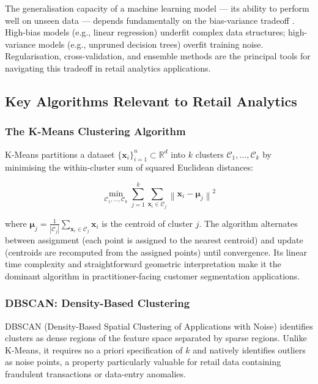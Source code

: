 The generalisation capacity of a machine learning model — its ability to perform well on unseen data — depends fundamentally on the bias-variance tradeoff \cite{Goodfellow2016}. High-bias models (e.g., linear regression) underfit complex data structures; high-variance models (e.g., unpruned decision trees) overfit training noise. Regularisation, cross-validation, and ensemble methods are the principal tools for navigating this tradeoff in retail analytics applications.

\subsection{Key Algorithms Relevant to Retail Analytics}

\subsubsection{The K-Means Clustering Algorithm}

K-Means \cite{jain1999data} partitions a dataset $\{\mathbf{x}_i\}_{i=1}^n \subset \mathbb{R}^d$ into $k$ clusters $\mathcal{C}_1, \ldots, \mathcal{C}_k$ by minimising the within-cluster sum of squared Euclidean distances:

\begin{equation}
    \min_{\mathcal{C}_1,\ldots,\mathcal{C}_k} \sum_{j=1}^k \sum_{\mathbf{x}_i \in \mathcal{C}_j} \left\|\mathbf{x}_i - \boldsymbol{\mu}_j\right\|^2
    \label{eq:kmeans_objective}
\end{equation}

where $\boldsymbol{\mu}_j = \frac{1}{|\mathcal{C}_j|} \sum_{\mathbf{x}_i \in \mathcal{C}_j} \mathbf{x}_i$ is the centroid of cluster $j$. The algorithm alternates between assignment (each point is assigned to the nearest centroid) and update (centroids are recomputed from the assigned points) until convergence. Its linear time complexity and straightforward geometric interpretation make it the dominant algorithm in practitioner-facing customer segmentation applications.

\subsubsection{DBSCAN: Density-Based Clustering}

DBSCAN (Density-Based Spatial Clustering of Applications with Noise) \cite{ester1996density} identifies clusters as dense regions of the feature space separated by sparse regions. Unlike K-Means, it requires no a priori specification of $k$ and natively identifies outliers as noise points, a property particularly valuable for retail data containing fraudulent transactions or data-entry anomalies.

